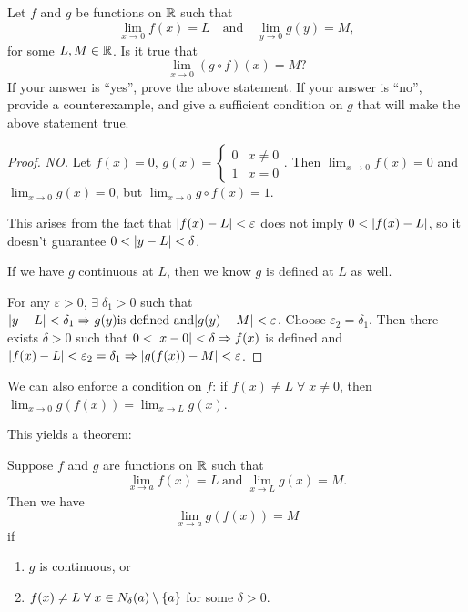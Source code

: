 \documentclass[12pt]{article}
\begin{document}
\begin{problem}
    Let $f$ and $g$ be functions on $\mathbb{R}$ such that \[
        \lim_{x \to 0} f(x) = L \quad\text{and}\quad \lim_{y \to 0} g(y) = M,
    \] for some $L, M \in \mathbb{R}$.
    Is it true that \[
        \lim_{x \to 0} (g \circ f)(x) = M?
    \] If your answer is ``yes'', prove the above statement.
    If your answer is ``no'', provide a counterexample, and give a sufficient condition on $g$ that will make the above statement true.
\end{problem}
\begin{proof}
    \emph{NO.}
    Let $f(x) = 0$, $g(x) = \begin{cases} 0 & x \neq 0 \\ 1 & x = 0 \end{cases}$.
    Then $\lim_{x \to 0} f(x) = 0$ and $\lim_{x \to 0} g(x) = 0$, but $\lim_{x \to 0} g \circ f (x) = 1$.
    
    This arises from the fact that $\abs{f(x) - L} < \varepsilon$ does not imply $0 < \abs{f(x) - L}$, so it doesn't guarantee $0 < \abs{y - L} < \delta$.
    
    If we have $g$ continuous at $L$, then we know $g$ is defined at $L$ as well.
    
    For any $\varepsilon > 0$, $\exists\; \delta_{1} > 0$ such that $\abs{y - L} < \delta_{1} \implies g(y) \textrm{is defined and} \abs{g(y) - M} < \varepsilon$.
    Choose $\varepsilon_{2} = \delta_{1}$.
    Then there exists $\delta > 0$ such that $0 < \abs{x - 0} < \delta \implies f(x)$ is defined and $\abs{f(x) - L} < \varepsilon_{2} = \delta_{1} \implies \abs{g(f(x)) - M} < \varepsilon$.
\end{proof}
\begin{rem}
    We can also enforce a condition on $f$: if $f(x) \neq L \;\forall\; x \neq 0$, then $\lim_{x \to 0} g(f(x)) = \lim_{x \to L} g(x)$.
\end{rem}
This yields a theorem:
\begin{thm} \label{thm:limit:composition}
    Suppose $f$ and $g$ are functions on $\mathbb{R}$ such that \[
        \lim_{x \to a} f(x) = L \;\textrm{and}\; \lim_{x \to L} g(x) = M.
    \] Then we have \[
        \lim_{x \to a} g(f(x)) = M
    \] if
    \begin{enumerate}[label=(\alph*)]
        \item $g$ is continuous, or
        \item $f(x) \neq L \;\forall\; x \in N_{\delta}(a) \setminus \set{a}$ for some $\delta > 0$.
    \end{enumerate}
\end{thm}
\end{document}

